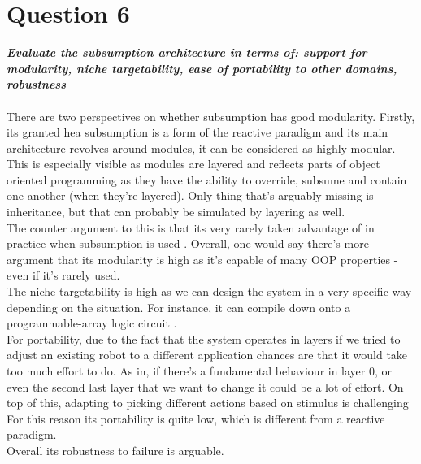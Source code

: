 \documentclass{article}
\newcommand\tab[1][1cm]{\hspace*{#1}}
\begin{document}
\section*{Question 6}
\textbf{\textit{
    \tab Evaluate  the  subsumption  architecture  in  terms  of:  support  for modularity, niche targetability, 
    ease of portability to other domains, robustness
}} \\ \\
There are two perspectives on whether subsumption has good modularity.
Firstly, its granted hea  subsumption is a form of the reactive 
paradigm and its main architecture revolves around modules, 
it can be considered as highly modular. This is especially visible as 
modules are layered and reflects parts of object oriented programming as 
they have the ability to override, 
subsume and contain one another (when they're layered). 
Only thing that's arguably missing is inheritance, but 
that can probably be simulated by layering as well. \\
\tab The counter argument to this is that its very rarely
taken advantage of in practice when subsumption is used \cite{FangTang}. 
Overall, one would say there's more argument that its modularity is high as
it's capable of many OOP properties - even if it's rarely used.
\\
\tab 
The niche targetability is high as we can design the system in a very specific way depending on the situation.
For instance, it can compile down onto a programmable-array logic circuit \cite{FangTang}.
\\
\tab For portability, due to the fact that the system operates in layers 
if we tried to adjust an existing robot to a different application
chances are that it would take too much effort to do. As in, if 
there's a fundamental behaviour in layer 0, or even
the second last layer that we want to change it could be a lot 
of effort. On top of this, adapting to picking
different actions based on stimulus is challenging
For this reason its portability is quite low, which 
is different from a reactive paradigm. \cite{IntroToAI} \\
\tab Overall its robustness to failure is arguable. 
\end{document}
